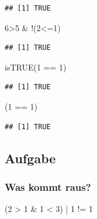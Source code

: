 \documentclass[
]{book}
\newenvironment{Shaded}{\begin{snugshade}}{\end{snugshade}}
\newcommand{\DecValTok}[1]{\textcolor[rgb]{0.00,0.00,0.81}{#1}}
\newcommand{\FunctionTok}[1]{\textcolor[rgb]{0.00,0.00,0.00}{#1}}
\newcommand{\NormalTok}[1]{#1}
\newcommand{\SpecialCharTok}[1]{\textcolor[rgb]{0.00,0.00,0.00}{#1}}
\begin{document}
\begin{verbatim}
## [1] TRUE
\end{verbatim}

\begin{Shaded}
\begin{Highlighting}[]
\DecValTok{6}\SpecialCharTok{\textgreater{}}\DecValTok{5} \SpecialCharTok{\&} \SpecialCharTok{!}\NormalTok{(}\DecValTok{2}\SpecialCharTok{\textless{}=}\DecValTok{1}\NormalTok{)}
\end{Highlighting}
\end{Shaded}

\begin{verbatim}
## [1] TRUE
\end{verbatim}

\begin{Shaded}
\begin{Highlighting}[]
\FunctionTok{isTRUE}\NormalTok{(}\DecValTok{1} \SpecialCharTok{==} \DecValTok{1}\NormalTok{)}
\end{Highlighting}
\end{Shaded}

\begin{verbatim}
## [1] TRUE
\end{verbatim}

\begin{Shaded}
\begin{Highlighting}[]
\NormalTok{(}\DecValTok{1} \SpecialCharTok{==} \DecValTok{1}\NormalTok{)}
\end{Highlighting}
\end{Shaded}

\begin{verbatim}
## [1] TRUE
\end{verbatim}

\hypertarget{aufgabe-1}{%
\subsection*{Aufgabe}\label{aufgabe-1}}

\hypertarget{was-kommt-raus-1}{%
\subsubsection*{Was kommt raus?}\label{was-kommt-raus-1}}

\begin{Shaded}
\begin{Highlighting}[]
\NormalTok{(}\DecValTok{2} \SpecialCharTok{\textgreater{}} \DecValTok{1} \SpecialCharTok{\&} \DecValTok{1} \SpecialCharTok{\textless{}} \DecValTok{3}\NormalTok{) }\SpecialCharTok{|} \DecValTok{1} \SpecialCharTok{!=} \DecValTok{1}
\end{Highlighting}
\end{Shaded}
\end{document}
